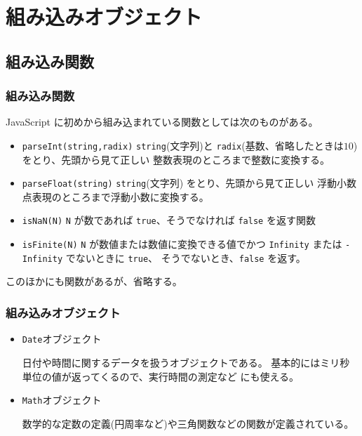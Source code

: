 \section{組み込みオブジェクト}
\subsection{組み込み関数}
\begin{frame}[containsverbatim]
 \frametitle{組み込み関数}
JavaScript に初めから組み込まれている関数としては次のものがある。
\begin{itemize}
 \item \Verb+parseInt(string,radix)+ \Verb+string+(文字列)と
       \Verb+radix+(基数、省略したときは$10$)をとり、先頭から見て正しい
       整数表現のところまで整数に変換する。
 \item \Verb+parseFloat(string)+ \Verb+string+(文字列)
       をとり、先頭から見て正しい
       浮動小数点表現のところまで浮動小数に変換する。
 \item \Verb+isNaN(N)+ \Verb+N+ が数であれば \Verb+true+、そうでなければ
       \Verb+false+ を返す関数
 \item \Verb+isFinite(N)+ \Verb+N+ が数値または数値に変換できる値でかつ
       \Verb+Infinity+ または \Verb+-Infinity+ でないときに \Verb+true+、
       そうでないとき、\Verb+false+ を返す。
\end{itemize}
このほかにも関数があるが、省略する。
\end{frame}

\begin{frame}[containsverbatim]
 \frametitle{組み込みオブジェクト}
\begin{itemize}
 \item \texttt{Date}オブジェクト

日付や時間に関するデータを扱うオブジェクトである。
基本的にはミリ秒単位の値が返ってくるので、実行時間の測定など
にも使える。
 \item {\texttt{Math}オブジェクト}

数学的な定数の定義(円周率など)や三角関数などの関数が定義されている。
\end{itemize}
\end{frame}




